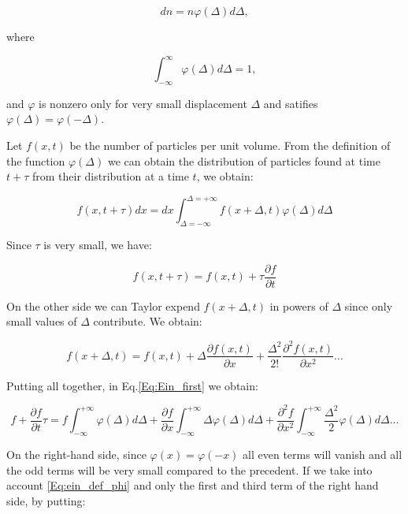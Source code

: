 \begin{equation}
	dn = n\varphi(\Delta)d\Delta,
\end{equation}

where

\begin{equation}
	\int_{-\infty} ^{\infty} \varphi (\Delta)d \Delta = 1,
	\label{Eq:ein_def_phi}
\end{equation}

and $\varphi$ is nonzero only for very small displacement $\Delta$ and satifies $\varphi (\Delta) = \varphi (-\Delta)$.

Let $f(x,t)$ be the number of particles per unit volume. From the definition of the function $\varphi(\Delta)$ we can obtain the distribution of particles found at time $ t + \tau$ from their distribution at a time $t$, we obtain:

\begin{equation}
	f(x, t+\tau)dx = dx\int_{\Delta = -\infty} ^{\Delta = +\infty} f(x+\Delta, t) \varphi (\Delta) d\Delta
	\label{Eq:Ein_first}
\end{equation}

Since $\tau$ is very small, we have:

\begin{equation}
	f(x, t+\tau) = f(x,t) + \tau \frac{\partial f}{\partial t}
\end{equation}

On the other side we can Taylor expend $f(x+\Delta, t)$ in powers of $\Delta$ since only small values of $\Delta$ contribute. We obtain:

\begin{equation}
	f(x + \Delta, t) = f(x,t) + \Delta \frac{\partial f(x,t)}{\partial x} + \frac{\Delta ^2}{2!} \frac{\partial ^2 f(x,t)}{\partial x^2}...
\end{equation}

Putting all together, in Eq.\ref{Eq:Ein_first} we obtain:

\begin{equation}
	f + \frac{\partial f}{\partial t} \tau = f \int_{-\infty}^{+\infty} \varphi(\Delta)d \Delta + \frac{\partial f}{\partial x} \int_{-\infty}^{+\infty} \Delta \varphi (\Delta)d \Delta + \frac{\partial ^2 f}{\partial x^2} \int_{-\infty}^{+\infty} \frac{\Delta ^2}{2} \varphi(\Delta)d\Delta ...
	\label{Eq:ein_expended}
\end{equation}

On the right-hand side, since $\varphi(x) = \varphi(-x)$ all even terms will vanish and all the odd terms will be very small compared to the precedent. If we take into account \ref{Eq:ein_def_phi} and only the first and third term of the right hand side, by putting:

